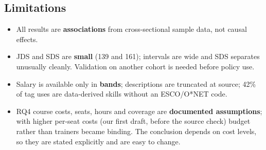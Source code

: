 \subsection*{Limitations}
\begin{itemize}
  \item All results are \textbf{associations} from cross-sectional sample data, not causal effects.
  \item JDS and SDS are \textbf{small} (139 and 161); intervals are wide and SDS separates unusually
        cleanly. Validation on another cohort is needed before policy use.
  \item Salary is available only in \textbf{bands}; descriptions are truncated at source; 42\% of tag
        uses are data-derived skills without an ESCO/O*NET code.
  \item RQ4 course costs, seats, hours and coverage are \textbf{documented assumptions}; with higher
        per-seat costs (our first draft, before the source check) budget rather than trainers became
        binding. The conclusion depends on cost levels, so they are stated explicitly and are easy to
        change.
\end{itemize}
